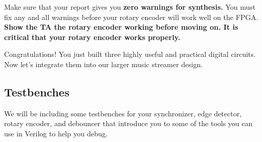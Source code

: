 \documentclass[11pt]{article}
\begin{document}
Make sure that your report gives you \textbf{zero warnings for synthesis.} You must fix any and all warnings before your rotary encoder will work well on the FPGA.\\

\textbf{Show the TA the rotary encoder working before moving on. It is critical that your rotary encoder works properly.}

Congratulations! You just built three highly useful and practical digital circuits. Now let's integrate them into our larger music streamer design.

\subsection{Testbenches}

We will be including some testbenches for your synchronizer, edge detector, rotary encoder, and debouncer that introduce you to some of the tools you can use in Verilog to help you debug.
\end{document}
